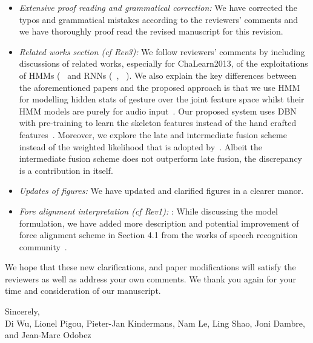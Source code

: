 \documentclass[12pt]{article}
\begin{document}
\begin{itemize}
\item {\em Extensive proof reading and grammatical correction:} We have corrected the typos and grammatical mistakes according to the reviewers' comments and we have thoroughly proof read the revised manuscript for this revision.

\item {\em Related works section (cf Rev3):} We follow reviewers' comments by including discussions of related works, especially for ChaLearn2013, of the exploitations of HMMs (~\cite{nandakumar2013multi, wu2013fusing} and RNNs (~\cite{neverova2013multi}, ~\cite{wu2013fusing, socher2012convolutional}). We also explain the key differences between the aforementioned papers and the proposed approach is that we use HMM for modelling hidden stats of gesture over the joint feature space whilst their HMM models are purely for audio input~\cite{nandakumar2013multi,wu2013fusing}. Our proposed system uses DBN with pre-training to learn the skeleton features instead of the hand crafted features~\cite{neverova2013multi}. Moreover, we explore the late and intermediate fusion scheme instead of the weighted likelihood that is adopted by~\cite{nandakumar2013multi}. Albeit the intermediate fusion scheme does not outperform late fusion, the discrepancy is a contribution in itself.

\item {\em Updates of figures:} We have updated and clarified figures in a clearer manor.
%
 \item {\em Fore alignment interpretation (cf Rev1): }: While discussing the model formulation, we have added more description and potential improvement of force alignment scheme in Section 4.1 from the works of speech recognition community~\cite{yu2012automatic}.

\end{itemize}
We hope that these new clarifications, and paper modifications will satisfy the reviewers as well as address your own comments. We thank you again for your time and consideration of our manuscript.

\noindent Sincerely,\\[3mm]
Di Wu, Lionel Pigou, Pieter-Jan Kindermans, Nam Le, Ling Shao, Joni Dambre, and Jean-Marc Odobez



\end{document}

